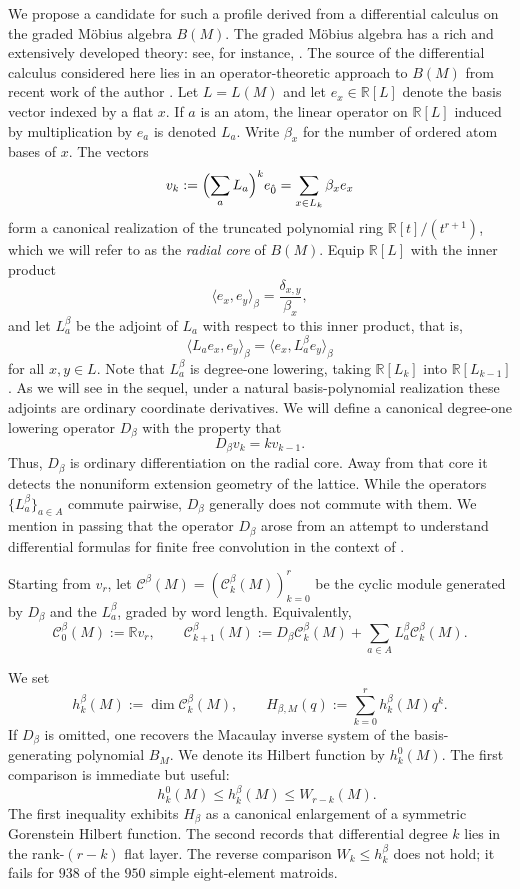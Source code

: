 \documentclass[11pt]{amsart}
\theoremstyle{definition}
\theoremstyle{remark}
\newcommand{\R}{\mathbb{R}}
\newcommand{\cc}{\mathcal}
\newcommand{\ip}[2]{\langle #1, #2\rangle}
\begin{document}
We propose a candidate for such a profile derived from a differential calculus on the graded M\"obius algebra $B(M)$. The graded M\"obius algebra has a rich and extensively developed theory: see, for instance, \cites{BHMPW,LaClairMastroeniMcCulloughPeeva,Lee,MaenoNumata}. The source of the differential calculus considered here lies in an operator-theoretic approach to $B(M)$ from recent work of the author \cites{SinclairHamiltonian,SinclairFFC}.  Let $L=L(M)$ and let $e_x\in \R[L]$ denote the basis vector indexed by a flat $x$.  If $a$ is an atom, the linear operator on $\R[L]$ induced by multiplication by $e_a$ is denoted $L_a$.  Write $\beta_x$ for the number of ordered atom bases of $x$.  The vectors
\[
v_k :=\Bigl(\sum_aL_a\Bigr)^ke_{\hat 0}=\sum_{x\in L_k}\beta_xe_x
\]
form a canonical realization of the truncated polynomial ring $\R[t]/(t^{r+1})$, which we will refer to as the \emph{radial core} of $B(M)$.  Equip $\R[L]$ with the inner product
\[
\ip{e_x}{e_y}_\beta=\frac{\delta_{x,y}}{\beta_x},
\]
and let $L_a^\beta$ be the adjoint of $L_a$ with respect to this inner product, that is, \[\ip{L_ae_x}{e_y}_\beta = \ip{e_x}{L_a^\beta e_y}_\beta\] for all $x,y\in L$. Note that $L_a^\beta$ is degree-one lowering, taking $\R[L_k]$ into $\R[L_{k-1}]$.  As we will see in the sequel, under a natural basis-polynomial realization these adjoints are ordinary coordinate derivatives. We will define a canonical degree-one lowering operator $D_\beta$ with the property that
\[
D_\beta v_k=kv_{k-1}.
\]
Thus, $D_\beta$ is ordinary differentiation on the radial core. Away from that core it detects the nonuniform extension geometry of the lattice. While the operators $\{L_a^\beta\}_{a\in A}$ commute pairwise, $D_\beta$ generally does not commute with them.
We mention in passing that the operator $D_\beta$ arose from an attempt to understand differential formulas for finite free convolution in the context of \cite{SinclairFFC}.

Starting from $v_r$, let $\cc C^\beta(M)=(\cc C_k^\beta(M))_{k=0}^r$ be the cyclic module generated by $D_\beta$ and the $L_a^\beta$, graded by word length. Equivalently,
\[
\cc C_0^\beta(M):=\R v_r,\qquad
\cc C_{k+1}^\beta(M):=D_\beta\cc C_k^\beta(M)+\sum_{a\in A}L_a^\beta\cc C_k^\beta(M).
\]

We set
\[
h_k^\beta(M) :=\dim \cc C_k^\beta(M),\qquad
H_{\beta,M}(q) :=\sum_{k=0}^rh_k^\beta(M)q^k.
\]
If $D_\beta$ is omitted, one recovers the Macaulay inverse system of the basis-generating polynomial $B_M$. We denote its Hilbert function by $h_k^0(M)$.  The first comparison is immediate but useful:
\[
\quad h_k^0(M)\le h_k^\beta(M)\le W_{r-k}(M).
\]
The first inequality exhibits $H_\beta$ as a canonical enlargement of a symmetric Gorenstein Hilbert function.  The second records that differential degree $k$ lies in the rank-$(r-k)$ flat layer.  The reverse comparison $W_k\le h_k^\beta$ does not hold; it fails for $938$ of the $950$ simple eight-element matroids.
\end{document}
